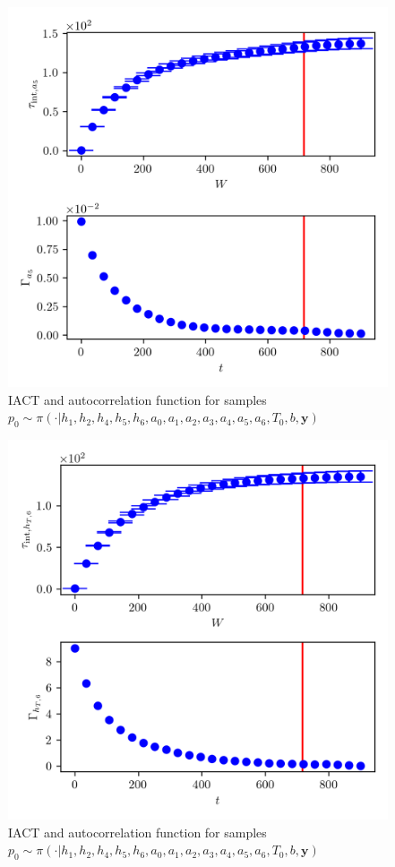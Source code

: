 \begin{figure}[ht!]
	\centering
	\includegraphics{UwerrTauIntTWalk15.png}
	\caption[IACT and autocorrelation function for $p_0$ samples]{IACT and autocorrelation function for samples $p_0 \sim \pi( \cdot | h_1,h_2,h_4,h_5,h_6,a_0,a_1,a_2,a_3,a_4,a_5,a_6,T_0,b, \bm{y})$}
	\label{fig:}
\end{figure}
\begin{figure}[ht!]
	\centering
	\includegraphics{UwerrTauIntTWalk16.png}
	\caption[IACT and autocorrelation function for $p_0$ samples]{IACT and autocorrelation function for samples $p_0 \sim \pi( \cdot | h_1,h_2,h_4,h_5,h_6,a_0,a_1,a_2,a_3,a_4,a_5,a_6,T_0,b, \bm{y})$}
	\label{fig:}
\end{figure}

